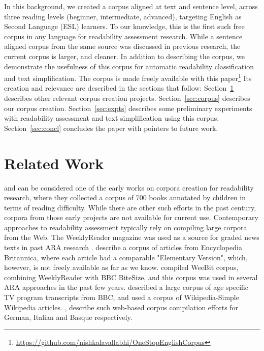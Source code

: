 \documentclass[11pt,a4paper]{article}
\begin{document}
In this background, we created a corpus aligned at text and sentence level, across three reading levels (beginner, intermediate, advanced), targeting English as Second Language (ESL) learners. To our knowledge, this is the first such free corpus in any language for readability assessment research. While a sentence aligned corpus from the same source was discussed in previous research, the current corpus is larger, and cleaner. In addition to describing the corpus, we demonstrate the usefulness of this corpus for automatic readability classification and text simplification. The corpus is made freely available with this paper\footnote{\url{https://github.com/nishkalavallabhi/OneStopEnglishCorpus}} Its creation and relevance are described in the sections that follow: Section~\ref{sec:relw} describes other relevant corpus creation projects. Section~\ref{sec:corpus} describes our corpus creation. Section~\ref{sec:expts} describes some preliminary experiments with readability assessment and text simplification using this corpus. Section~\ref{sec:concl} concludes the paper with pointers to future work. 

\section{Related Work}
\label{sec:relw}

\citet{Washburne.Vogel-26} and \citet{Vogel.Washburne-28} can be considered one of the early works on corpora creation for readability research, where they collected a corpus of 700 books annotated by children in terms of reading difficulty. While there are other such efforts in the past century, corpora from those early projects are not available for current use. Contemporary approaches to readability assessment typically rely on compiling large corpora from the Web. The WeeklyReader magazine was used as a source for graded news texts in past ARA research \cite{Petersen-07,Feng-10}. \citet{Petersen.Ostendorf-09} describe a corpus of articles from Encyclopedia Britannica, where each article had a comparable "Elementary Version", which, however, is not freely available as far as we know. \citet{Vajjala.Meurers-12} compiled WeeBit corpus, combining WeeklyReader with BBC BiteSize, and this corpus was used in several ARA approaches in the past few years. \cite{Vajjala.Meurers-13} described a large corpus of age specific TV program transcripts from BBC, and \cite{Napoles.Dredze-10} used a corpus of Wikipedia-Simple Wikipedia articles. \cite{Hancke.Vajjala.Meurers-12,DellOrletta.Montemagni.ea-11,Gonzalez-Dios.Aranzabe.ea-14b}, describe such web-based corpus compilation efforts for German, Italian and Basque respectively. 
\end{document}
